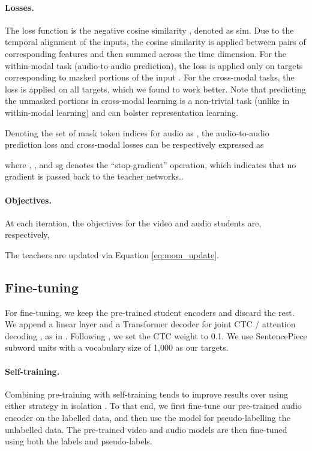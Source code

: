 \documentclass{article} \usepackage{iclr2023_conference,times}
\begin{document}
\paragraph{Losses.} The loss function is the negative cosine similarity \citep{grill2020bootstrap}, denoted as sim. Due to the temporal alignment of the inputs, the cosine similarity is applied between pairs of corresponding features and then summed across the time dimension. For the within-modal task (audio-to-audio prediction), the loss is applied only on targets corresponding to masked portions of the input \citep{devlin2018bert}. For the cross-modal tasks, the loss is applied on all targets, which we found to work better. Note that predicting the unmasked portions in cross-modal learning is a non-trivial task (unlike in within-modal learning) and can bolster representation learning.

Denoting the set of mask token indices for audio as , the audio-to-audio prediction loss and cross-modal losses can be respectively expressed as

where , , and sg denotes the ``stop-gradient'' operation, which indicates that no gradient is passed back to the teacher networks..
\paragraph{Objectives.} At each iteration, the objectives for the video and audio students are, respectively,

The teachers are updated via Equation \ref{eq:mom_update}.

\subsection{Fine-tuning} \label{sec:finetune_main}
For fine-tuning, we keep the pre-trained student encoders and discard the rest. We append a linear layer and a Transformer decoder for joint CTC / attention decoding \citep{watanabe2017hybrid}, as in \citet{ma2021end}. Following \citet{ma2021end}, we set the CTC weight to 0.1. We use SentencePiece \citep{kudo2018sentencepiece} subword units with a vocabulary size of 1,000 as our targets.
\paragraph{Self-training.} Combining pre-training with self-training tends to improve results over using either strategy in isolation \citep{xu2021self, shi2022learning}. To that end, we first fine-tune our pre-trained audio encoder on the labelled data, and then use the model for pseudo-labelling the unlabelled data. The pre-trained video and audio models are then fine-tuned using both the labels and pseudo-labels.
\end{document}
